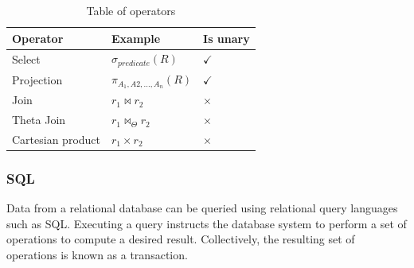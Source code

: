 \begin{table}[h]
    \centering
    \begin{tabular}{|lll|}
    \hline 
    \multicolumn{1}{|l|}{\textbf{Operator}}          & \multicolumn{1}{l|}{\textbf{Example}}   & \multicolumn{1}{l|}{\textbf{Is unary}}      \\ \hline
    \multicolumn{1}{|l|}{Select}                     & \multicolumn{1}{l|}{$\sigma_{predicate}(R)$}             & \multicolumn{1}{l|}{$\checkmark$}           \\ \hline
    \multicolumn{1}{|l|}{Projection}                 & \multicolumn{1}{l|}{$\pi_{A_1, A2,...,A_n}(R)$}             & \multicolumn{1}{l|}{$\checkmark$}           \\ \hline
    \multicolumn{1}{|l|}{Join}                       & \multicolumn{1}{l|}{$r_1 \Join r_2$}             & \multicolumn{1}{l|}{$\times$}           \\ \hline
    \multicolumn{1}{|l|}{Theta Join}                 & \multicolumn{1}{l|}{$r_1 \Join_\Theta r_2$}             & \multicolumn{1}{l|}{$\times$}           \\ \hline
    \multicolumn{1}{|l|}{Cartesian product}          & \multicolumn{1}{l|}{$r_1\times r_2$}              & \multicolumn{1}{l|}{$\times$}            \\ \hline
    \end{tabular}
    \caption{Table of operators}
    \label{Relational algebra operators}
\end{table}



\subsubsection{SQL}\label{sec:SQL}

Data from a relational database can be queried using relational query languages such as SQL.
Executing a query instructs the database system to perform a set of operations to compute a desired result. Collectively, the resulting set of operations is known as a transaction.

